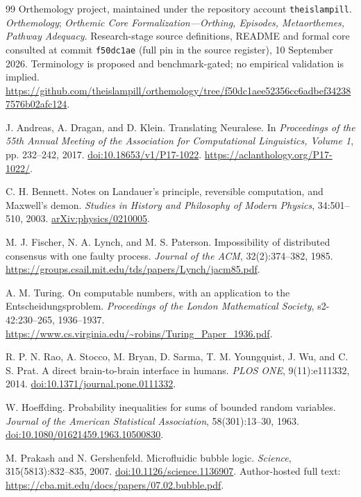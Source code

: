 \documentclass[11pt,a4paper]{article}
\theoremstyle{definition}
\theoremstyle{remark}
\begin{document}
\begin{thebibliography}{99}
Orthemology project, maintained under the repository account \texttt{theislampill}. \emph{Orthemology}; \emph{Orthemic Core Formalization---Orthing, Episodes, Metaorthemes, Pathway Adequacy}. Research-stage source definitions, README and formal core consulted at commit \texttt{f50dc1ae} (full pin in the source register), 10 September 2026. Terminology is proposed and benchmark-gated; no empirical validation is implied. \url{https://github.com/theislampill/orthemology/tree/f50dc1aee52356cc6adbef342387576b02afc124}.

J. Andreas, A. Dragan, and D. Klein. Translating Neuralese. In \emph{Proceedings of the 55th Annual Meeting of the Association for Computational Linguistics, Volume 1}, pp. 232--242, 2017. \href{https://doi.org/10.18653/v1/P17-1022}{doi:10.18653/v1/P17-1022}. \url{https://aclanthology.org/P17-1022/}.

C. H. Bennett. Notes on Landauer's principle, reversible computation, and Maxwell's demon. \emph{Studies in History and Philosophy of Modern Physics}, 34:501--510, 2003. \href{https://arxiv.org/abs/physics/0210005}{arXiv:physics/0210005}.

M. J. Fischer, N. A. Lynch, and M. S. Paterson. Impossibility of distributed consensus with one faulty process. \emph{Journal of the ACM}, 32(2):374--382, 1985. \url{https://groups.csail.mit.edu/tds/papers/Lynch/jacm85.pdf}.

A. M. Turing. On computable numbers, with an application to the Entscheidungsproblem. \emph{Proceedings of the London Mathematical Society}, s2-42:230--265, 1936--1937. \url{https://www.cs.virginia.edu/~robins/Turing_Paper_1936.pdf}.

R. P. N. Rao, A. Stocco, M. Bryan, D. Sarma, T. M. Youngquist, J. Wu, and C. S. Prat. A direct brain-to-brain interface in humans. \emph{PLOS ONE}, 9(11):e111332, 2014. \href{https://doi.org/10.1371/journal.pone.0111332}{doi:10.1371/journal.pone.0111332}.

W. Hoeffding. Probability inequalities for sums of bounded random variables. \emph{Journal of the American Statistical Association}, 58(301):13--30, 1963. \href{https://doi.org/10.1080/01621459.1963.10500830}{doi:10.1080/01621459.1963.10500830}.

M. Prakash and N. Gershenfeld. Microfluidic bubble logic. \emph{Science}, 315(5813):832--835, 2007. \href{https://doi.org/10.1126/science.1136907}{doi:10.1126/science.1136907}. Author-hosted full text: \url{https://cba.mit.edu/docs/papers/07.02.bubble.pdf}.


\end{thebibliography}
\end{document}

